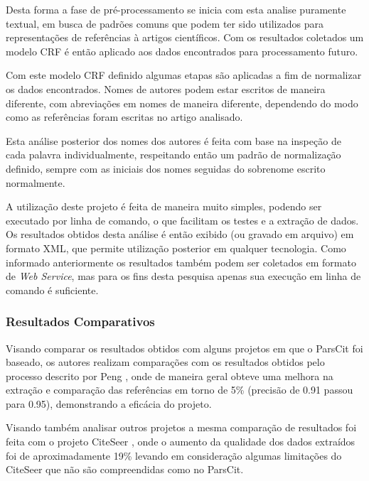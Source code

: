 Desta forma a fase de pré-processamento se inicia com esta analise puramente textual, em busca de padrões comuns que podem ter sido utilizados para representações de referências à artigos científicos. Com os resultados coletados um modelo CRF é então aplicado aos dados encontrados para processamento futuro.

Com este modelo CRF definido algumas etapas são aplicadas a fim de normalizar os dados encontrados. Nomes de autores podem estar escritos de maneira diferente, com abreviações em nomes de maneira diferente, dependendo do modo como as referências foram escritas no artigo analisado.

Esta análise posterior dos nomes dos autores é feita com base na inspeção de cada palavra individualmente, respeitando então um padrão de normalização definido, sempre com as iniciais dos nomes seguidas do sobrenome escrito normalmente.

A utilização deste projeto é feita de maneira muito simples, podendo ser executado por linha de comando, o que facilitam os testes e a extração de dados. Os resultados obtidos desta análise é então exibido (ou gravado em arquivo) em formato XML, que permite utilização posterior em qualquer tecnologia. Como informado anteriormente os resultados também podem ser coletados em formato de \textit{Web Service}, mas para os fins desta pesquisa apenas sua execução em linha de comando é suficiente.

\subsubsection{Resultados Comparativos}
\label{sssec:parscit-comparative}

Visando comparar os resultados obtidos com alguns projetos em que o ParsCit foi baseado, os autores realizam comparações com os resultados obtidos pelo processo descrito por Peng \cite{Peng-CRF-IE}, onde de maneira geral obteve uma melhora na extração e comparação das referências em torno de 5\% (precisão de 0.91 passou para 0.95), demonstrando a eficácia do projeto.

Visando também analisar outros projetos a mesma comparação de resultados foi feita com o projeto CiteSeer \cite{citeseer}, onde o aumento da qualidade dos dados extraídos foi de aproximadamente 19\% levando em consideração algumas limitações do CiteSeer que não são compreendidas como no ParsCit.


	


